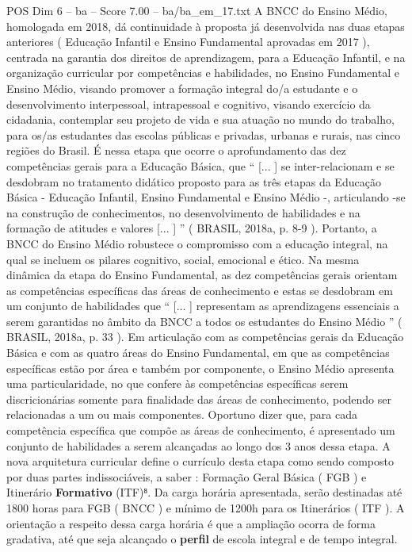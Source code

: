 \begin{textsample}{POS Dim 6 – ba – Score 7.00 – ba/ba\_em\_17.txt}
A BNCC do Ensino Médio, homologada em 2018, dá continuidade à proposta já desenvolvida nas duas etapas anteriores ( Educação Infantil e Ensino Fundamental aprovadas em 2017 ), centrada na garantia dos direitos de aprendizagem, para a Educação Infantil, e na organização curricular por competências e habilidades, no Ensino Fundamental e Ensino Médio, visando promover a formação integral do/a estudante e o desenvolvimento interpessoal, intrapessoal e cognitivo, visando exercício da cidadania, contemplar seu projeto de vida e sua atuação no mundo do trabalho, para os/as estudantes das escolas públicas e privadas, urbanas e rurais, nas cinco regiões do Brasil.
É nessa etapa que ocorre o aprofundamento das dez competências gerais para a Educação Básica, que “ [... ] se inter-relacionam e se desdobram no tratamento didático proposto para as três etapas da Educação Básica - Educação Infantil, Ensino Fundamental e Ensino Médio -, articulando -se na construção de conhecimentos, no desenvolvimento de habilidades e na formação de atitudes e valores [... ] ” ( BRASIL, 2018a, p. 8-9 ).
Portanto, a BNCC do Ensino Médio robustece o compromisso com a educação integral, na qual se incluem os pilares cognitivo, social, emocional e ético.
Na mesma dinâmica da etapa do Ensino Fundamental, as dez competências gerais orientam as competências específicas das áreas de conhecimento e estas se desdobram em um conjunto de habilidades que “ [... ] representam as aprendizagens essenciais a serem garantidas no âmbito da BNCC a todos os estudantes do Ensino Médio ” ( BRASIL, 2018a, p. 33 ).
Em articulação com as competências gerais da Educação Básica e com as quatro áreas do Ensino Fundamental, em que as competências específicas estão por área e também por componente, o Ensino Médio apresenta uma particularidade, no que confere às competências específicas serem discricionárias somente para finalidade das áreas de conhecimento, podendo ser relacionadas a um ou mais componentes.
Oportuno dizer que, para cada competência específica que compõe as áreas de conhecimento, é apresentado um conjunto de habilidades a serem alcançadas ao longo dos 3 anos dessa etapa.
A nova arquitetura curricular define o currículo desta etapa como sendo composto por duas partes indissociáveis, a saber : Formação Geral Básica ( FGB ) e Itinerário \textbf{Formativo} (ITF)⁸.
Da carga horária apresentada, serão destinadas até 1800 horas para FGB ( BNCC ) e mínimo de 1200h para os Itinerários ( ITF ).
A orientação a respeito dessa carga horária é que a ampliação ocorra de forma gradativa, até que seja alcançado o \textbf{perfil} de escola integral e de tempo integral.

\end{textsample}
